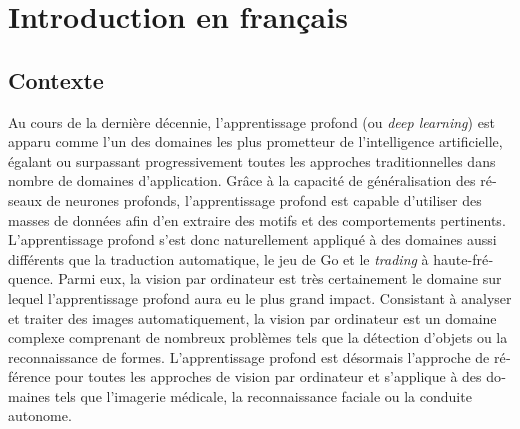 \chapter*{Introduction en français}
\label{chap:intro_fr}

\begin{otherlanguage}{french}
\section*{Contexte}


Au cours de la dernière décennie, l'apprentissage profond (ou \textit{deep learning}) est apparu comme l'un des domaines les plus prometteur de l'intelligence artificielle, égalant ou surpassant progressivement toutes les approches traditionnelles dans nombre de domaines d'application. Grâce à la capacité de généralisation des réseaux de neurones profonds, l'apprentissage profond est capable d'utiliser des masses de données afin d'en extraire des motifs et des comportements pertinents. L'apprentissage profond s'est donc naturellement appliqué à des domaines aussi différents que la traduction automatique, le jeu de Go et le \textit{trading} à haute-fréquence. Parmi eux, la vision par ordinateur est très certainement le domaine sur lequel l'apprentissage profond aura eu le plus grand impact. Consistant à analyser et traiter des images automatiquement, la vision par ordinateur est un domaine complexe comprenant de nombreux problèmes tels que la détection d'objets ou la reconnaissance de formes. L'apprentissage profond est désormais l'approche de référence pour toutes les approches de vision par ordinateur et s'applique à des domaines tels que l'imagerie médicale, la reconnaissance faciale ou la conduite autonome. 


\end{otherlanguage}
